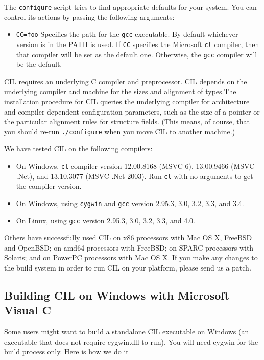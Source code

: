 \documentclass{article}
\def\t#1{{\tt #1}}
\begin{document}
 The \t{configure} script tries to find appropriate defaults for your system.
You can control its actions by passing the following arguments:
\begin{itemize}
\item \t{CC=foo} Specifies the path for the \t{gcc} executable. By default
whichever version is in the PATH is used. If \t{CC} specifies the Microsoft
\t{cl} compiler, then that compiler will be set as the default one. Otherwise,
the \t{gcc} compiler will be the default.
\end{itemize}

 CIL requires an underlying C compiler and preprocessor. CIL depends on the
underlying compiler and machine for the sizes and alignment of types.The
installation procedure for CIL queries the underlying compiler for
architecture and compiler dependent configuration parameters, such as the size
of a pointer or the particular alignment rules for structure fields. (This
means, of course, that you should re-run \t{./configure} when you move CIL to
another machine.)

We have tested CIL on the following compilers:

\begin{itemize}
\item On Windows, \t{cl} compiler version 12.00.8168 (MSVC 6),
  13.00.9466 (MSVC .Net), and 13.10.3077 (MSVC .Net 2003).  Run \t{cl}
  with no arguments to get the compiler version.  
\item On Windows, using \t{cygwin} and \t{gcc} version 2.95.3, 3.0,
  3.2, 3.3, and 3.4.
\item On Linux, using \t{gcc} version 2.95.3, 3.0, 3.2, 3.3, and 4.0.
\end{itemize}

Others have successfully used CIL on x86 processors with Mac OS X,
FreeBSD and OpenBSD; on amd64 processors with FreeBSD; on SPARC
processors with Solaris; and on PowerPC processors with Mac OS X.  If
you make any changes to the build system in order to run CIL on your
platform, please send us a patch.

  \subsection{Building CIL on Windows with Microsoft Visual C}

 Some users might want to build a standalone CIL executable on Windows (an
executable that does not require cygwin.dll to run). You will need cygwin for
the build process only. Here is how we do it
\end{document}
